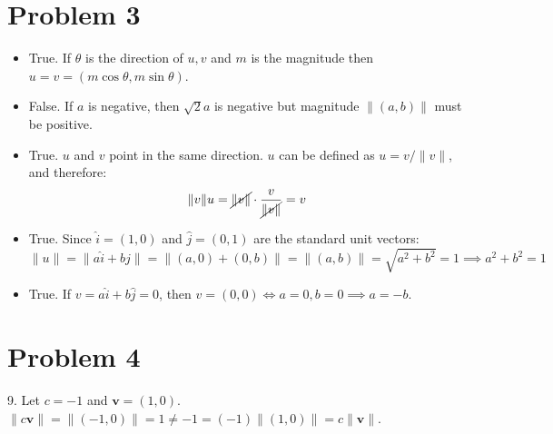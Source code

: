 \documentclass[preview, margin=0.6in]{standalone}
\newcommand*{\problem}[1]{\section*{Problem #1}}
\begin{document}
\problem{3}
\begin{itemize}
	\item[(a)] True. If $\theta$ is the direction of $u,v$ and $m$ is the magnitude then $u=v=(m\cos\theta,m\sin\theta)$.
	\item[(b)] False. If $a$ is negative, then $\sqrt{2}a$ is negative but magnitude $\lVert (a,b) \rVert $ must be positive.
	\item[(c)] True. $u$ and $v$ point in the same direction. $u$ can be defined as $u=v/\lVert v \rVert $, and therefore:
		\begin{equation*}
		    \lVert v \rVert u
			=\cancel{\lVert v \rVert}\cdot \frac{v}{\cancel{\lVert v \rVert}}
			=v
		\end{equation*}
	\item[(d)] True. Since $\hat i=(1,0)$ and $\hat j=(0,1)$ are the standard unit vectors:
		\begin{equation*}
		    \lVert u \rVert 
			=\lVert a\hat i+b\hat j \rVert 
			=\lVert (a,0)+(0,b) \rVert 
			=\lVert (a,b) \rVert 
			=\sqrt{a^2+b^2}
			=1
			\implies a^2+b^2=1
		\end{equation*}
	\item[(e)] True. If $v=a\hat i+b\hat j=0$, then $v=(0,0)\iff a=0,b=0 \implies a=-b$.
\end{itemize}

\problem{4}
9. Let $c=-1$ and $\mathbf{v}=(1,0)$. $\lVert c \mathbf{v} \rVert =\lVert (-1,0) \rVert =1 \neq -1 =(-1) \lVert (1,0) \rVert =c \lVert \mathbf{v} \rVert $.
\end{document}

